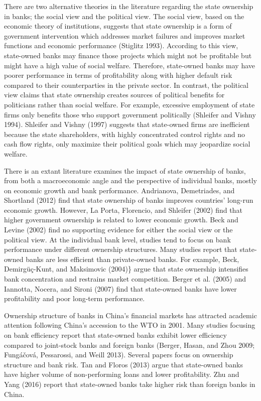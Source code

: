 \documentclass{article}
\begin{document}
There are two alternative theories in the literature regarding the state
ownership in banks; the social view and the political view. The social
view, based on the economic theory of institutions, suggests that state
ownership is a form of government intervention which addresses market
failures and improves market functions and economic performance
(Stiglitz 1993). According to this view, state-owned banks may finance
those projects which might not be profitable but might have a high value
of social welfare. Therefore, state-owned banks may have poorer
performance in terms of profitability along with higher default risk
compared to their counterparties in the private sector. In contrast, the
political view claims that state ownership creates sources of political
benefits for politicians rather than social welfare. For example,
excessive employment of state firms only benefits those who support
government politically (Shleifer and Vishny 1994). Shleifer and Vishny
(1997) suggests that state-owned firms are inefficient because the state
shareholders, with highly concentrated control rights and no cash flow
rights, only maximize their political goals which may jeopardize social
welfare.

There is an extant literature examines the impact of state ownership of
banks, from both a macroeconomic angle and the perspective of individual
banks, mostly on economic growth and bank performance. Andrianova,
Demetriades, and Shortland (2012) find that state ownership of banks
improves countries' long-run economic growth. However, La Porta,
Florencio, and Shleifer (2002) find that higher government ownership is
related to lower economic growth. Beck and Levine (2002) find no
supporting evidence for either the social view or the political view. At
the individual bank level, studies tend to focus on bank performance
under different ownership structures. Many studies report that
state-owned banks are less efficient than private-owned banks. For
example, Beck, Demirgüç-Kunt, and Maksimovic (2004)\} argue that state
ownership intensifies bank concentration and restrains market
competition. Berger et al. (2005) and Iannotta, Nocera, and Sironi
(2007) find that state-owned banks have lower profitability and poor
long-term performance.

Ownership structure of banks in China's financial markets has attracted
academic attention following China's accession to the WTO in 2001. Many
studies focusing on bank efficiency report that state-owned banks
exhibit lower efficiency compared to joint-stock banks and foreign banks
(Berger, Hasan, and Zhou 2009; Fungáčová, Pessarossi, and Weill 2013).
Several papers focus on ownership structure and bank risk. Tan and
Floros (2013) argue that state-owned banks have higher volume of
non-performing loans and lower profitability. Zhu and Yang (2016) report
that state-owned banks take higher risk than foreign banks in China.
\end{document}
